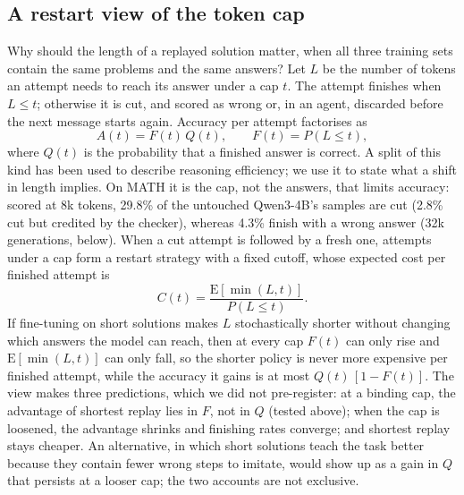 \documentclass[10pt]{article}
\newcommand{\E}{\mathrm{E}}
\begin{document}
\subsection{A restart view of the token cap}
Why should the length of a replayed solution matter, when all three training sets contain the same problems and the same answers? Let $L$ be the number of tokens an attempt needs to reach its answer under a cap $t$. The attempt finishes when $L\le t$; otherwise it is cut, and scored as wrong or, in an agent, discarded before the next message starts again. Accuracy per attempt factorises as
\begin{equation}
A(t)=F(t)\,Q(t),\qquad F(t)=P(L\le t),
\label{eq:fq}
\end{equation}
where $Q(t)$ is the probability that a finished answer is correct. A split of this kind has been used to describe reasoning efficiency\cite{kaiser2026decomposing,nie2026truncation}; we use it to state what a shift in length implies. On MATH it is the cap, not the answers, that limits accuracy: scored at 8k tokens, 29.8\% of the untouched Qwen3-4B's samples are cut (2.8\% cut but credited by the checker), whereas 4.3\% finish with a wrong answer (32k generations, below). When a cut attempt is followed by a fresh one, attempts under a cap form a restart strategy with a fixed cutoff\cite{luby1993optimal}, whose expected cost per finished attempt is
\begin{equation}
C(t)=\frac{\E[\min(L,t)]}{P(L\le t)}.
\label{eq:restart}
\end{equation}
If fine-tuning on short solutions makes $L$ stochastically shorter without changing which answers the model can reach, then at every cap $F(t)$ can only rise and $\E[\min(L,t)]$ can only fall, so the shorter policy is never more expensive per finished attempt, while the accuracy it gains is at most $Q(t)\,[1-F(t)]$. The view makes three predictions, which we did not pre-register: at a binding cap, the advantage of shortest replay lies in $F$, not in $Q$ (tested above); when the cap is loosened, the advantage shrinks and finishing rates converge; and shortest replay stays cheaper. An alternative, in which short solutions teach the task better because they contain fewer wrong steps to imitate, would show up as a gain in $Q$ that persists at a looser cap; the two accounts are not exclusive.
\end{document}
